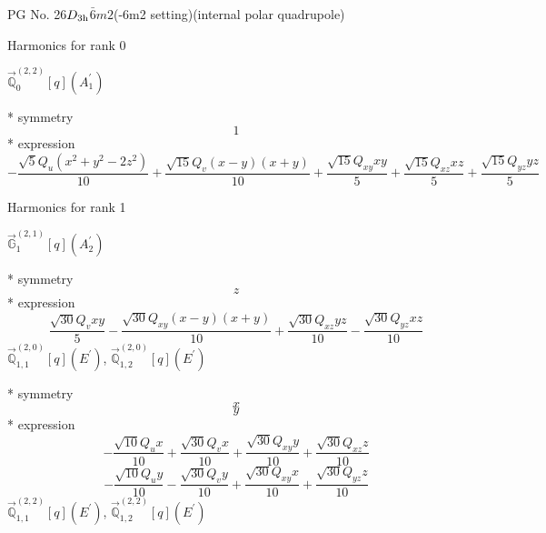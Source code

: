\documentclass[fleqn,8pt]{jsarticle}
\begin{document}
\setcounter{MaxMatrixCols}{32}

\renewcommand{\tablename}{Table~}
\renewcommand{\figurename}{Figure~}
\begin{center}
\LARGE
PG No. 26\quad$D_{\rm 3h}$\quad$\bar{6}m2$\quad(-6m2 setting)\quad[ hexagonal ] (internal polar quadrupole)
\end{center}

\noindent * Harmonics for rank 0

\noindent\quad $\vec{\mathbb{Q}}_{0}^{(2,2)}[q](A_{1}^{\prime})$

\noindent\quad ** symmetry
\begin{dmath*}
1
\end{dmath*}
\noindent\quad ** expression
\begin{dmath*}
- \frac{\sqrt{5} Q_{u} \left(x^{2} + y^{2} - 2 z^{2}\right)}{10} + \frac{\sqrt{15} Q_{v} \left(x - y\right) \left(x + y\right)}{10} + \frac{\sqrt{15} Q_{xy} x y}{5} + \frac{\sqrt{15} Q_{xz} x z}{5} + \frac{\sqrt{15} Q_{yz} y z}{5}
\end{dmath*}

\noindent * Harmonics for rank 1

\noindent\quad $\vec{\mathbb{G}}_{1}^{(2,1)}[q](A_{2}^{\prime})$

\noindent\quad ** symmetry
\begin{dmath*}
z
\end{dmath*}
\noindent\quad ** expression
\begin{dmath*}
\frac{\sqrt{30} Q_{v} x y}{5} - \frac{\sqrt{30} Q_{xy} \left(x - y\right) \left(x + y\right)}{10} + \frac{\sqrt{30} Q_{xz} y z}{10} - \frac{\sqrt{30} Q_{yz} x z}{10}
\end{dmath*}
\noindent\quad $\vec{\mathbb{Q}}_{1,1}^{(2,0)}[q](E^{\prime})$, $\vec{\mathbb{Q}}_{1,2}^{(2,0)}[q](E^{\prime})$

\noindent\quad ** symmetry
\begin{dmath*}
x
\end{dmath*}
\begin{dmath*}
y
\end{dmath*}
\noindent\quad ** expression
\begin{dmath*}
- \frac{\sqrt{10} Q_{u} x}{10} + \frac{\sqrt{30} Q_{v} x}{10} + \frac{\sqrt{30} Q_{xy} y}{10} + \frac{\sqrt{30} Q_{xz} z}{10}
\end{dmath*}
\begin{dmath*}
- \frac{\sqrt{10} Q_{u} y}{10} - \frac{\sqrt{30} Q_{v} y}{10} + \frac{\sqrt{30} Q_{xy} x}{10} + \frac{\sqrt{30} Q_{yz} z}{10}
\end{dmath*}
\noindent\quad $\vec{\mathbb{Q}}_{1,1}^{(2,2)}[q](E^{\prime})$, $\vec{\mathbb{Q}}_{1,2}^{(2,2)}[q](E^{\prime})$
\end{document}
